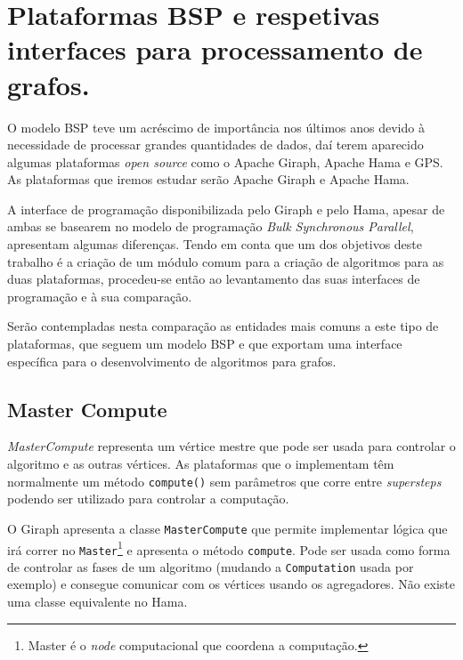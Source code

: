 \section{Plataformas BSP e respetivas interfaces para processamento de grafos.}

O modelo BSP teve um acréscimo de importância nos últimos anos devido à 
necessidade de processar grandes quantidades de dados, daí terem aparecido 
algumas plataformas \textit{open source} como o Apache Giraph, Apache Hama e 
GPS. As plataformas que iremos estudar serão Apache Giraph e 
Apache Hama.

A interface de programação disponibilizada pelo Giraph e pelo Hama, apesar de 
ambas se basearem no modelo de programação \textit{Bulk Synchronous Parallel}, 
apresentam algumas diferenças. Tendo em conta que um dos objetivos deste 
trabalho é a criação de um módulo comum para a criação de algoritmos para as 
duas plataformas, procedeu-se então ao levantamento das suas interfaces de 
programação e à sua comparação. 

Serão contempladas nesta comparação as entidades mais comuns a este tipo de 
plataformas, que seguem um modelo BSP e que exportam uma interface específica 
para o desenvolvimento de algoritmos para grafos. 

\subsection{Master Compute}
\textit{MasterCompute} representa um vértice mestre que pode ser usada para controlar o algoritmo e as outras vértices. As plataformas que o implementam têm normalmente um método \texttt{compute()} sem parâmetros que corre entre \textit{supersteps} podendo ser utilizado para controlar a computação.


O Giraph apresenta a classe \texttt{MasterCompute} que permite implementar lógica que irá correr no \texttt{Master}\footnote{Master é o \textit{node} computacional que coordena a computação.} e apresenta o método \texttt{compute}. Pode ser usada como forma de controlar as fases de um algoritmo (mudando a \texttt{Computation} usada por exemplo) e consegue comunicar com os vértices usando os agregadores. Não existe uma classe equivalente no Hama.











%
